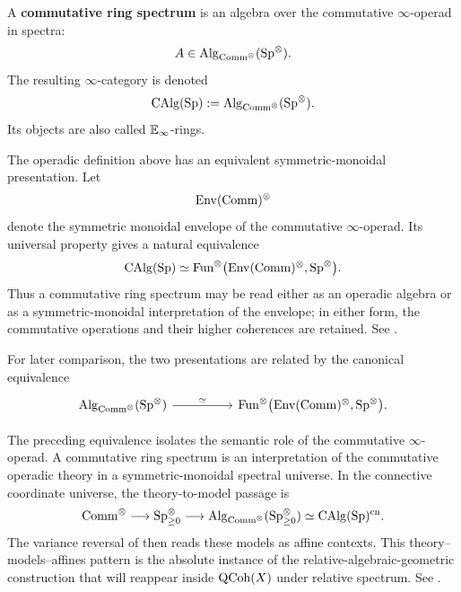 \begin{definition}
\label{def:commutative-ring-spectrum}
A \textbf{commutative ring spectrum} is an algebra over the commutative
$\infty$-operad in spectra:
\[
    A
    \in
    \operatorname{Alg}_{\mathrm{Comm}^\otimes}(\operatorname{Sp}^\otimes).
\]
The resulting $\infty$-category is denoted
\[
    \operatorname{CAlg}(\operatorname{Sp})
    :=
    \operatorname{Alg}_{\mathrm{Comm}^\otimes}(\operatorname{Sp}^\otimes).
\]
Its objects are also called $\mathbb E_\infty$-rings.
\end{definition}

\begin{remark}
\label{rem:spectral-commutative-envelope}
The operadic definition above has an equivalent symmetric-monoidal
presentation. Let
\[
    \operatorname{Env}(\mathrm{Comm})^\otimes
\]
denote the symmetric monoidal envelope of the commutative
$\infty$-operad. Its universal property gives a natural equivalence
\[
    \operatorname{CAlg}(\operatorname{Sp})
    \simeq
    \operatorname{Fun}^\otimes
    \bigl(
        \operatorname{Env}(\mathrm{Comm})^\otimes,
        \operatorname{Sp}^\otimes
    \bigr).
\]
Thus a commutative ring spectrum may be read either as an operadic algebra or
as a symmetric-monoidal interpretation of the envelope; in either form, the
commutative operations and their higher coherences are retained. See
\cite[Proposition~2.2.4.9]{LurieHigherAlgebra}.
\end{remark}

For later comparison, the two presentations are related by the canonical
equivalence
\[
\begin{tikzcd}[column sep=huge]
    \Alg_{\Comm^\otimes}(\Sp^\otimes)
        \arrow[r, "\simeq"]
    &
    \Fun^\otimes
    \bigl(
        \operatorname{Env}(\Comm)^\otimes,
        \Sp^\otimes
    \bigr).
\end{tikzcd}
\]

\begin{remark}
\label{rem:theory-semantic-universe-relative-geometry}
The preceding equivalence isolates the semantic role of the commutative
\(\infty\)-operad. A commutative ring spectrum is an interpretation of the
commutative operadic theory in a symmetric-monoidal spectral universe. In
the connective coordinate universe, the theory-to-model passage is
\[
    \mathrm{Comm}^\otimes
    \longrightarrow
    \operatorname{Sp}_{\geq0}^\otimes
    \longrightarrow
    \operatorname{Alg}_{\mathrm{Comm}^\otimes}(\operatorname{Sp}_{\geq0}^\otimes)
    \simeq
    \operatorname{CAlg}(\operatorname{Sp})^{\mathrm{cn}}.
\]
The variance reversal of  then reads these
models as affine contexts. This theory--models--affines pattern is the
absolute instance of the relative-algebraic-geometric construction that will
reappear inside \(\operatorname{QCoh}(X)\) under relative spectrum. See
\cite{LurieHigherAlgebra,LurieSAG,KhanBraveNewMotivicI}.
\end{remark}

